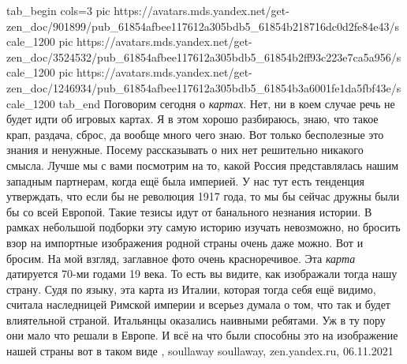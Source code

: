 
\ifcmt
  tab_begin cols=3
     pic https://avatars.mds.yandex.net/get-zen_doc/901899/pub_61854afbee117612a305bdb5_61854b218716dc0d2fe84e43/scale_1200
     pic https://avatars.mds.yandex.net/get-zen_doc/3524532/pub_61854afbee117612a305bdb5_61854b2ff93c223e7ca5a956/scale_1200
		 pic https://avatars.mds.yandex.net/get-zen_doc/1246934/pub_61854afbee117612a305bdb5_61854b3a6001fe1da5fbf43e/scale_1200
  tab_end
\fi
Поговорим сегодня о \emph{картах}. Нет, ни в коем случае речь не будет идти об
игровых картах. Я в этом хорошо разбираюсь, знаю, что такое крап, раздача,
сброс, да вообще много чего знаю. Вот только бесполезные это знания и ненужные.
Посему рассказывать о них нет решительно никакого смысла. Лучше мы с вами
посмотрим на то, какой Россия представлялась нашим западным партнерам, когда
ещё была империей. У нас тут есть тенденция утверждать, что если бы не
революция 1917 года, то мы бы сейчас дружны были бы со всей Европой. Такие
тезисы идут от банального незнания истории. В рамках небольшой подборки эту
самую историю изучать невозможно, но бросить взор на импортные изображения
родной страны очень даже можно. Вот и бросим.  На мой взгляд, заглавное фото
очень красноречивое. Эта \emph{карта} датируется 70-ми годами 19 века. То есть
вы видите, как изображали тогда нашу страну. Судя по языку, эта карта из
Италии, которая тогда себя ещё видимо, считала наследницей Римской империи и
всерьез думала о том, что так и будет влиятельной страной.  Итальянцы оказались
наивными ребятами. Уж в ту пору они мало что решали в Европе. И всё на что были
способны это на изображение нашей страны вот в таком виде
, 
soullaway soullaway, zen.yandex.ru, 06.11.2021
